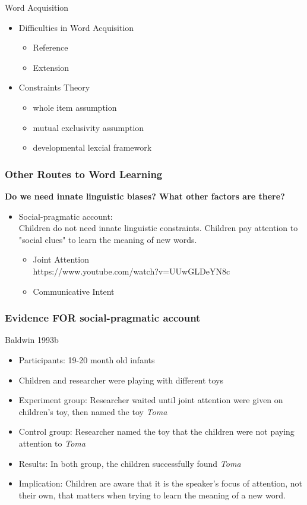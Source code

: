 \documentclass{beamer}
\begin{document}
\begin{frame}{Word Acquisition}
\begin{itemize}
\item Difficulties in Word Acquisition
\pause 
\begin{itemize}
    \item Reference
    \item Extension
\end{itemize}
\item Constraints Theory
\begin{itemize}
    \item whole item assumption
    \item mutual exclusivity assumption 
    \item developmental lexcial framework
\end{itemize}
\end{itemize}
\end{frame}
\begin{frame}
\frametitle{Other Routes to Word Learning}
\textbf{Do we need innate linguistic biases? What other factors are there?}
\begin{itemize}
\item Social-pragmatic account: 
\\ Children do not need innate linguistic constraints. Children pay attention to "social clues" to learn the meaning of new words. 
\begin{itemize}
    \item Joint Attention
    \\ https://www.youtube.com/watch?v=UUwGLDeYN8c
    \pause
    \item Communicative Intent
\end{itemize}
\end{itemize}
\end{frame}
\begin{frame}
\frametitle{Evidence FOR social-pragmatic account}
Baldwin 1993b 
\begin{itemize}
\item Participants: 19-20 month old infants
\item Children and researcher were playing with different toys
\item Experiment group: Researcher waited until joint attention were given on children's toy, then named the toy \textit{Toma}
\item Control group: Researcher named the toy that the children were not paying attention to \textit{Toma}
\item Results: In both group, the children successfully found \textit{Toma}
\item Implication: Children are aware that it is the speaker’s focus of attention, not their own, that matters when trying to learn the meaning of a new word.
\end{itemize}
\end{frame}
\end{document}
